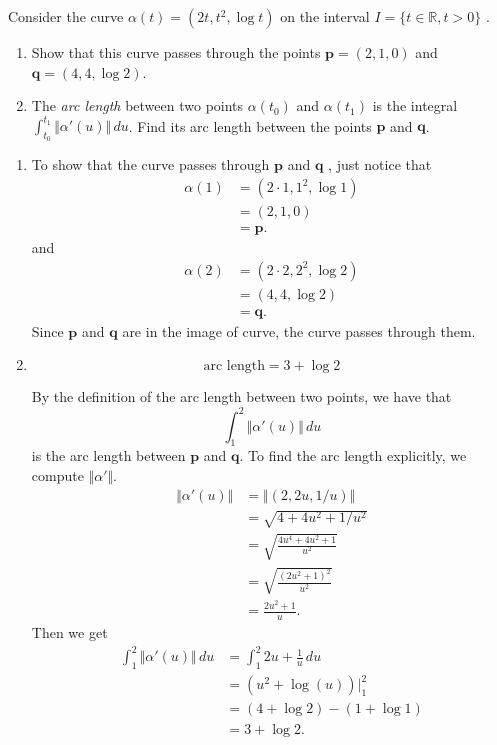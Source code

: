 \documentclass[12 pt, letterpaper]{hmcpset}
\begin{document}
\begin{problem}[Problem 3]
	Consider the curve $\alpha(t) = (2t, t^{2}, \log t)$ on the interval $I = \{ t \in \mathbb{R}, t > 0 \}$ .
	\begin{enumerate}
		\item Show that this curve passes through the points $\mathbf{p} = (2, 1, 0)$ and $\mathbf{q} = (4, 4, \log 2)$.
		\item The \textit{arc length} between two points $\alpha(t_{0})$ and $\alpha(t_{1})$ is the integral $\int_{t_{0}}^{t_{1}} \Vert \alpha'(u) \Vert \, du$. Find its arc length between the points $\mathbf{p}$ and $\mathbf{q}$.
	\end{enumerate}
\end{problem}

\begin{solution}
	\begin{enumerate}
		\item To show that the curve passes through $\mathbf{p}$  and $\mathbf{q}$ , just notice that
			 \[
				\begin{split}
					\alpha(1) & = (2 \cdot 1, 1^{2}, \log 1) \\
						  & = (2, 1, 0) \\
						  & = \mathbf{p}.
				\end{split}	
			\]
			and
			\[
				\begin{split}
					\alpha(2) & = (2 \cdot 2, 2^{2}, \log 2) \\
						  & = (4, 4, \log 2) \\
						  & = \mathbf{q}.
				\end{split}
			\]
			Since $\mathbf{p}$ and $\mathbf{q}$ are in the image of curve, the curve passes through them.
		\item 
			\[
				\boxed{
					\text{arc length} = 3 + \log 2
				}
			\] 

			By the definition of the arc length between two points, we have that
			\[
				\int_{1}^{2} \Vert \alpha'(u) \Vert \, du
			\]
			is the arc length between $\mathbf{p}$ and $\mathbf{q}$. To find the arc length explicitly, we compute $\Vert \alpha' \Vert$.
			\[
				\begin{split}
					\Vert \alpha'(u) \Vert & = \Vert (2, 2u, 1/u) \Vert \\
							       & = \sqrt{4 + 4u^{2} + 1/u^{2}} \\
							       & = \sqrt{\frac{4u^{4} + 4u^{2} + 1}{u^{2}}} \\
							       & = \sqrt{\frac{(2u^{2} + 1)^{2}}{u^{2}}} \\
							       & = \frac{2u^{2} + 1}{u}.
				\end{split}
			\]
			Then we get
			\[
				\begin{split}
					\int_{1}^{2} \Vert \alpha'(u) \Vert \, du & = \int_{1}^{2} 2u + \frac{1}{u} \, du \\
										  & = (u^{2} + \log(u)) \Big |_{1}^{2} \\
										  & = (4 + \log 2) - (1 + \log 1) \\
										  & = 3 + \log 2.
				\end{split}
			\]
	\end{enumerate}
\end{solution}
\end{document}
